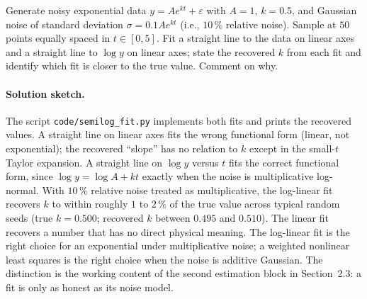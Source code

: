\begin{exercise}
Generate noisy exponential data $y = A e^{kt} + \varepsilon$ with
$A = 1$, $k = 0.5$, and Gaussian noise of standard deviation
$\sigma = 0.1 A e^{kt}$ (i.e., $10\,\%$ relative noise). Sample at
$50$ points equally spaced in $t \in [0, 5]$. Fit a straight line
to the data on linear axes and a straight line to $\log y$ on
linear axes; state the recovered $k$ from each fit and identify
which fit is closer to the true value. Comment on why.

\paragraph{Solution sketch.}
The script \texttt{code/semilog\_fit.py} implements both fits and
prints the recovered values. A straight line on linear axes fits
the wrong functional form (linear, not exponential); the recovered
``slope'' has no relation to $k$ except in the small-$t$ Taylor
expansion. A straight line on $\log y$ versus $t$ fits the correct
functional form, since $\log y = \log A + k t$ exactly when the
noise is multiplicative log-normal. With $10\,\%$ relative noise
treated as multiplicative, the log-linear fit recovers $k$ to
within roughly $1$ to $2\,\%$ of the true value across typical
random seeds (true $k = 0.500$; recovered $k$ between $0.495$ and
$0.510$). The linear fit recovers a number that has no direct
physical meaning. The log-linear fit is the right choice for an
exponential under multiplicative noise; a weighted nonlinear least
squares is the right choice when the noise is additive Gaussian.
The distinction is the working content of the second estimation
block in Section~2.3: a fit is only as honest as its noise model.
\end{exercise}

